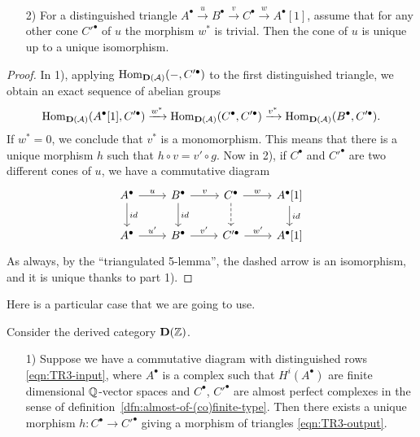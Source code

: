 \documentclass{article}
\numberwithin{equation}{section}
\begin{document}
\begin{appendices}
\begin{lemma}
\begin{enumerate}
  \item[2)] For a distinguished triangle
    $A^\bullet \xrightarrow{u} B^\bullet \xrightarrow{v} C^\bullet \xrightarrow{w} A^\bullet[1]$,
    assume that for any other cone $C'^\bullet$ of $u$ the morphism $w^*$ is
    trivial. Then the cone of $u$ is unique up to a unique isomorphism.
  \end{enumerate}

  \begin{proof}
    In 1), applying $\operatorname{Hom}_{\mathbf{D} (\mathcal{A})} (-, C'^\bullet)$ to the
    first distinguished triangle, we obtain an exact sequence of abelian groups
    \[ \operatorname{Hom}_{\mathbf{D} (\mathcal{A})} (A^\bullet [1], C'^\bullet) \xrightarrow{w^*}
    \operatorname{Hom}_{\mathbf{D} (\mathcal{A})} (C^\bullet, C'^\bullet) \xrightarrow{v^*}
    \operatorname{Hom}_{\mathbf{D} (\mathcal{A})} (B^\bullet, C'^\bullet). \]
    If $w^* = 0$, we conclude that $v^*$ is a monomorphism. This means that
    there is a unique morphism $h$ such that $h\circ v = v'\circ g$. Now in 2),
    if $C^\bullet$ and $C'^\bullet$ are two different cones of $u$, we have a
    commutative diagram
    \[ \begin{tikzcd}
      A^\bullet\ar{r}{u}\ar{d}{id} & B^\bullet\ar{r}{v}\ar{d}{id} & C^\bullet\ar{r}{w}\ar[dashed]{d} & A^\bullet [1]\ar{d}{id} \\
      A^\bullet\ar{r}{u'} & B^\bullet\ar{r}{v'} & C'^\bullet\ar{r}{w'} & A^\bullet [1]
    \end{tikzcd} \]
    As always, by the ``triangulated 5-lemma'', the dashed arrow is an
    isomorphism, and it is unique thanks to part 1).
  \end{proof}
\end{lemma}

Here is a particular case that we are going to use.

\begin{corollary}
  \label{cor:TR3-TR1-with-uniqueness}
  Consider the derived category $\mathbf{D} (\mathbb{Z})$.

  \begin{enumerate}
  \item[1)] Suppose we have a commutative diagram with distinguished rows
    \eqref{eqn:TR3-input}, where $A^\bullet$ is a complex such that
    $H^i (A^\bullet)$ are finite dimensional $\mathbb{Q}$-vector spaces and
    $C^\bullet$, $C'^\bullet$ are almost perfect complexes in the sense of
    definition~\ref{dfn:almost-of-(co)finite-type}. Then there exists a unique
    morphism ${h\colon C^\bullet \to C'^\bullet}$ giving a morphism of triangles
    \eqref{eqn:TR3-output}.


\end{enumerate}
\end{corollary}
\end{appendices}
\end{document}
